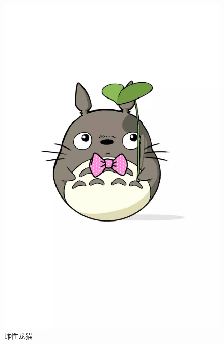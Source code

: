\documentclass[12pt]{ctexart}
\begin{document}
\begin{spacing}{1.5}
\begin{figure}[h]
\begin{minipage}[t]{0.3\linewidth}
		\includegraphics[width=1\textwidth]{figures/5.jpg}
		\caption*{雌性龙猫}
	\end{minipage}
	\hfill
	\begin{minipage}[t]{0.3\linewidth}

\end{minipage}
\end{figure}
\end{spacing}
\end{document}
